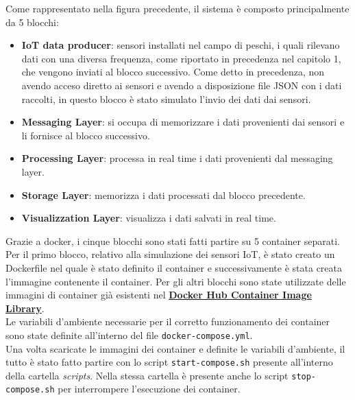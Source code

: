 \documentclass{article}
\begin{document}
\bigskip
\noindent
Come rappresentato nella figura precedente, il sistema è composto principalmente da 5 blocchi:
\begin{itemize}[noitemsep]
  \item \textbf{IoT data producer}: sensori installati nel campo di peschi, i quali rilevano dati con una diversa frequenza, come riportato in precedenza nel capitolo 1, che vengono inviati al blocco successivo. Come detto in precedenza, non avendo acceso diretto ai sensori e avendo a disposizione file JSON con i dati raccolti, in questo blocco è stato simulato l'invio dei dati dai sensori.
  \item \textbf{Messaging Layer}: si occupa di memorizzare i dati provenienti dai sensori e li fornisce al blocco successivo.
  \item \textbf{Processing Layer}: processa in real time i dati provenienti dal messaging layer.
  \item \textbf{Storage Layer}: memorizza i dati processati dal blocco precedente.
  \item \textbf{Visualizzation Layer}: visualizza i dati salvati in real time.
\end{itemize}
Grazie a docker, i cinque blocchi sono stati fatti partire su 5 container separati. \\
Per il primo blocco, relativo alla simulazione dei sensori IoT, è stato creato un Dockerfile nel quale è stato definito il container e successivamente è stata creata l'immagine contenente il container. Per gli altri blocchi sono state utilizzate delle immagini di container già esistenti nel \href{https://hub.docker.com} {\textbf{Docker Hub Container Image Library}}.\\
Le variabili d'ambiente necessarie per il corretto funzionamento dei container sono state definite all'interno del file \texttt{docker-compose.yml}.\\
Una volta scaricate le immagini dei container e definite le variabili d'ambiente, il tutto è stato fatto partire con lo script \texttt{start-compose.sh} presente all'interno della cartella \textit{scripts}. Nella stessa cartella è presente anche lo script \texttt{stop-compose.sh} per interrompere l'esecuzione dei container.
\end{document}
